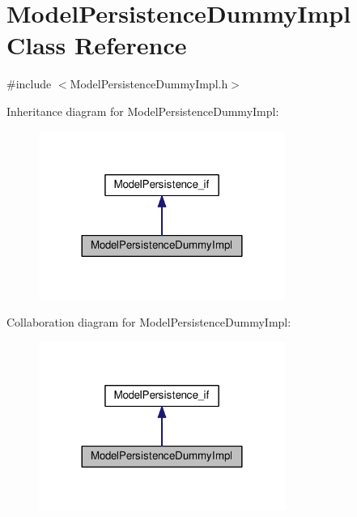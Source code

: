 \hypertarget{class_model_persistence_dummy_impl}{}\section{Model\+Persistence\+Dummy\+Impl Class Reference}
\label{class_model_persistence_dummy_impl}


{\ttfamily \#include $<$Model\+Persistence\+Dummy\+Impl.\+h$>$}



Inheritance diagram for Model\+Persistence\+Dummy\+Impl\+:\nopagebreak
\begin{figure}[H]
\begin{center}
\leavevmode
\includegraphics[width=228pt]{class_model_persistence_dummy_impl__inherit__graph}
\end{center}
\end{figure}


Collaboration diagram for Model\+Persistence\+Dummy\+Impl\+:\nopagebreak
\begin{figure}[H]
\begin{center}
\leavevmode
\includegraphics[width=228pt]{class_model_persistence_dummy_impl__coll__graph}
\end{center}
\end{figure}
